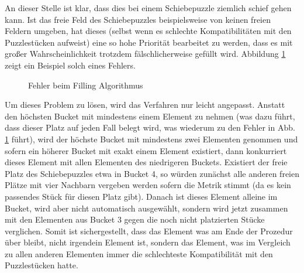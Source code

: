 \documentclass{whswinvcbook}
\begin{document}
An dieser Stelle ist klar, dass dies bei einem Schiebepuzzle ziemlich schief gehen kann. Ist das freie Feld des Schiebepuzzles beispielsweise von keinen freien Feldern umgeben, hat dieses (selbst wenn es schlechte Kompatibilitäten mit den Puzzlestücken aufweist) eine so hohe Priorität bearbeitet zu werden, dass es mit großer Wahrscheinlichkeit trotzdem fälschlicherweise gefüllt wird. Abbildung \ref{fig-dsf2} zeigt ein Beispiel solch eines Fehlers.
\begin{figure}[H]
    \centering
    \caption{Fehler beim Filling Algorithmus}
    \label{fig-dsf2}
\end{figure}
Um dieses Problem zu lösen, wird das Verfahren nur leicht angepasst. Anstatt den höchsten Bucket mit mindestens einem Element zu nehmen (was dazu führt, dass dieser Platz auf jeden Fall belegt wird, was wiederum zu den Fehler in Abb. \ref{fig-dsf2} führt), wird der höchste Bucket mit mindestens zwei Elementen genommen und sofern ein höherer Bucket mit exakt einem Element existiert, dann konkurriert dieses Element mit allen Elementen des niedrigeren Buckets. Existiert der freie Platz des Schiebepuzzles etwa in Bucket 4, so würden zunächst alle anderen freien Plätze mit vier Nachbarn vergeben werden sofern die Metrik stimmt (da es kein passendes Stück für diesen Platz gibt). Danach ist dieses Element alleine im Bucket, wird aber nicht automatisch ausgewählt, sondern wird jetzt zusammen mit den Elementen aus Bucket 3 gegen die noch nicht platzierten Stücke verglichen. Somit ist sichergestellt, dass das Element was am Ende der Prozedur über bleibt, nicht irgendein Element ist, sondern das Element, was im Vergleich zu allen anderen Elementen immer die schlechteste Kompatibilität mit den Puzzlestücken hatte.
\end{document}
